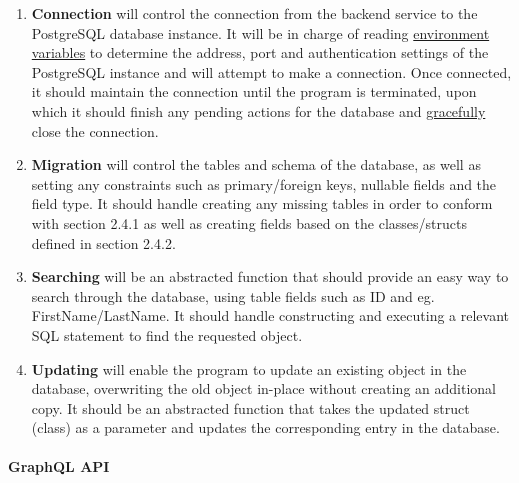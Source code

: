\documentclass[../../main.tex]{subfiles}
\begin{document}
\begin{enumerate}
    \item \textbf{Connection} will control the connection from the
          backend service to the PostgreSQL database instance. It will be in charge
          of reading \underline{environment variables} to determine
          the address, port and authentication settings of the PostgreSQL
          instance and will attempt to make a connection. Once connected,
          it should maintain the connection until the program is terminated,
          upon which it should finish any pending actions for the database
          and \underline{gracefully} close the connection.

    \item \textbf{Migration} will control the tables and schema of the
          database, as well as setting any constraints such as
          primary/foreign keys, nullable fields and the field type.
          It should handle creating any missing tables in order to conform
          with section 2.4.1 as well as creating fields based on the
          classes/structs defined in section 2.4.2.

    \item \textbf{Searching} will be an abstracted function that should
          provide an easy way to search through the database, using table fields
          such as ID and eg. FirstName/LastName. It should handle constructing
          and executing a relevant SQL statement to find the requested object.

    \item \textbf{Updating} will enable the program to update an existing
          object in the database, overwriting the old object in-place without creating
          an additional copy. It should be an abstracted function that takes the updated
          struct (class) as a parameter and updates the corresponding entry in the database.

\end{enumerate}

\paragraph{GraphQL API\\}
\end{document}
